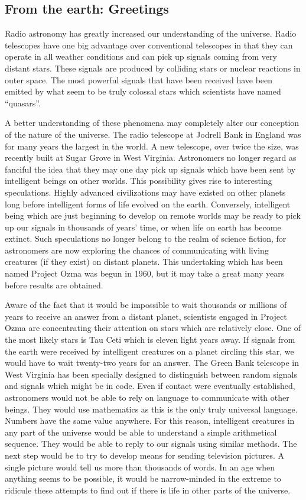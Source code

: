 \documentclass[11pt]{article}
\begin{document}
\subsection{From the earth: Greetings}
\label{sec-1-55}

Radio astronomy has greatly increased our understanding of the universe. Radio telescopes have one big advantage over conventional telescopes in that they can operate in all weather conditions and can pick up signals coming from very distant stars. These signals are produced by colliding stars or nuclear reactions in outer space. The most powerful signals that have been received have been emitted by what seem to be truly colossal stars which scientists have named ``quasars''.

A better understanding of these phenomena may completely alter our conception of the nature of the universe. The radio telescope at Jodrell Bank in England was for many years the largest in the world. A new telescope, over twice the size, was recently built at Sugar Grove in West Virginia. Astronomers no longer regard as fanciful the idea that they may one day pick up signals which have been sent by intelligent beings on other worlds. This possibility gives rise to interesting speculations. Highly advanced civilizations may have existed on other planets long before intelligent forms of life evolved on the earth. Conversely, intelligent being which are just beginning to develop on remote worlds may be ready to pick up our signals in thousands of years' time, or when life on earth has become extinct. Such speculations no longer belong to the realm of science fiction, for astronomers are now exploring the chances of communicating with living creatures (if they exist) on distant planets. This undertaking which has been named Project Ozma was begun in 1960, but it may take a great many years before results are obtained. 

Aware of the fact that it would be impossible to wait thousands or millions of years to receive an answer from a distant planet, scientists engaged in Project Ozma are concentrating their attention on stars which are relatively close. One of the most likely stars is Tau Ceti which is eleven light years away. If signals from the earth were received by intelligent creatures on a planet circling this star, we would have to wait twenty-two years for an answer. The Green Bank telescope in West Virginia has been specially designed to distinguish between random signals and signals which might be in code. Even if contact were eventually established, astronomers would not be able to rely on language to communicate with other beings. They would use mathematics as this is the only truly universal language. Numbers have the same value anywhere. For this reason, intelligent creatures in any part of the universe would be able to understand a simple arithmetical sequence. They would be able to reply to our signals using similar methods. The next step would be to try to develop means for sending television pictures. A single picture would tell us more than thousands of words. In an age when anything seems to be possible, it would be narrow-minded in the extreme to ridicule these attempts to find out if there is life in other parts of the universe. 
\end{document}
